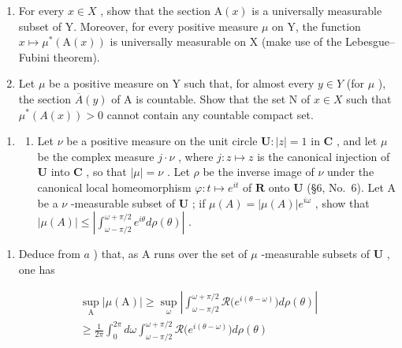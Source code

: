 \begin{enumerate}
\def\labelenumi{\alph{enumi})}
\item
  For every \(x \in X\) , show that the section \(\mathrm{A}(x)\) is a universally measurable subset of Y. Moreover, for every positive measure \(\mu\) on Y, the function \(x \mapsto \mu^{*}(\mathrm{A}(x))\) is universally measurable on X (make use of the Lebesgue--Fubini theorem).
\item
  Let \(\mu\) be a positive measure on Y such that, for almost every \(y \in Y\) (for \(\mu\) ), the section \(\overline{A}(y)\) of A is countable. Show that the set N of \(x \in X\) such that \(\mu^{*}(A(x)) > 0\) cannot contain any countable compact set.
\end{enumerate}

\begin{enumerate}
\def\labelenumi{\arabic{enumi})}
\setcounter{enumi}{19}
\tightlist
\item
  \begin{enumerate}
  \def\labelenumii{\alph{enumii})}
  \tightlist
  \item
    Let \(\nu\) be a positive measure on the unit circle \(\mathbf{U}: |z| = 1\) in \(\mathbf{C}\) , and let \(\mu\) be the complex measure \(j \cdot \nu\) , where \(j: z \mapsto z\) is the canonical injection of \(\mathbf{U}\) into \(\mathbf{C}\) , so that \(|\mu| = \nu\) . Let \(\rho\) be the inverse image of \(\nu\) under the canonical local homeomorphism \(\varphi: t \mapsto e^{it}\) of \(\mathbf{R}\) onto \(\mathbf{U}\) (§6, No.~6). Let A be a \(\nu\) -measurable subset of \(\mathbf{U}\) ; if \(\mu(A) = |\mu(A)|e^{i\omega}\) , show that \(|\mu(A)| \leqslant \left|\int_{\omega - \pi/2}^{\omega + \pi/2} e^{i\theta} d\rho(\theta)\right|\) .
  \end{enumerate}
\end{enumerate}

\begin{enumerate}
\def\labelenumi{\alph{enumi})}
\setcounter{enumi}{1}
\tightlist
\item
  Deduce from \(a\) ) that, as A runs over the set of \(\mu\) -measurable subsets of \(\mathbf{U}\) , one has
\end{enumerate}

\[
\begin{array}{l} \sup _ {\mathrm{A}} | \mu (\mathrm{A}) | \geqslant \sup _ {\omega} \left| \int_ {\omega - \pi / 2} ^ {\omega + \pi / 2} \mathcal {R} \big (e ^ {i (\theta - \omega)} \big) d \rho (\theta) \right| \\ \geqslant \frac {1}{2 \pi} \int_ {0} ^ {2 \pi} d \omega \int_ {\omega - \pi / 2} ^ {\omega + \pi / 2} \mathcal {R} \big (e ^ {i (\theta - \omega)} \big) d \rho (\theta) \end{array}
\]

